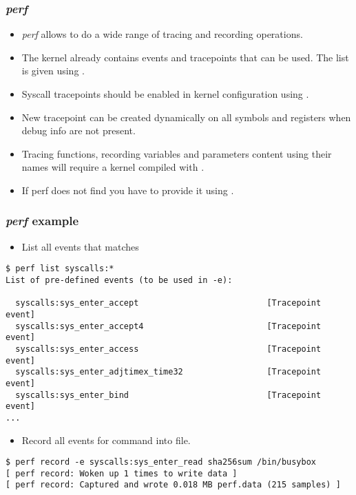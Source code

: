 \begin{frame}
  \frametitle{{\em perf}}
  \begin{itemize}
    \item {\em perf} allows to do a wide range of tracing and recording operations.
    \item The kernel already contains events and tracepoints that can be used.
          The list is given using .
    \item Syscall tracepoints should be enabled in kernel configuration using
          .
    \item New tracepoint can be created dynamically on all symbols and registers
          when debug info are not present.
    \item Tracing functions, recording variables and parameters content using
          their names will require a kernel compiled with
          .
    \item If perf does not find  you have to provide it
          using .
  \end{itemize}
\end{frame}

\begin{frame}[fragile]
  \frametitle{{\em perf} example}
  \begin{itemize}
    \item List all events that matches 
  \end{itemize}
  \begin{block}{}
    \begin{verbatim}
$ perf list syscalls:*
List of pre-defined events (to be used in -e):

  syscalls:sys_enter_accept                          [Tracepoint event]
  syscalls:sys_enter_accept4                         [Tracepoint event]
  syscalls:sys_enter_access                          [Tracepoint event]
  syscalls:sys_enter_adjtimex_time32                 [Tracepoint event]
  syscalls:sys_enter_bind                            [Tracepoint event]
...
    \end{verbatim}
  \end{block}
  \begin{itemize}
    \item Record all  events for 
          command into  file.
  \end{itemize}
  \begin{block}{}
    \begin{verbatim}
$ perf record -e syscalls:sys_enter_read sha256sum /bin/busybox
[ perf record: Woken up 1 times to write data ]
[ perf record: Captured and wrote 0.018 MB perf.data (215 samples) ]
    \end{verbatim}
  \end{block}
\end{frame}

